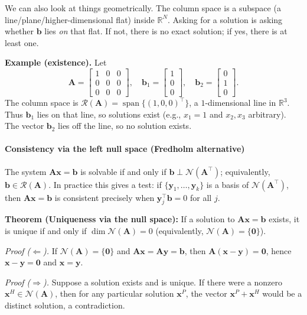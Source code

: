 We can also look at things geometrically. The column space is a subspace (a line/plane/higher-dimensional flat) inside $\mathbb{R}^N$. Asking for a solution is asking whether $\mathbf{b}$ lies \emph{on} that flat. If not, there is no exact solution; if yes, there is at least one.

\begin{exampleBox}
\textbf{Example (existence).} Let
\[
\mathbf{A}=\begin{bmatrix}1&0&0\\ 0&0&0\\ 0&0&0\end{bmatrix},\quad
\mathbf{b}_1=\begin{bmatrix}1\\0\\0\end{bmatrix},\quad
\mathbf{b}_2=\begin{bmatrix}0\\1\\0\end{bmatrix}.
\]
The column space is $\mathcal{R}(\mathbf{A})=\operatorname{span}\{(1,0,0)^{\top}\}$, a $1$-dimensional line in $\mathbb{R}^3$. Thus $\mathbf{b}_1$ lies on that line, so solutions exist (e.g., $x_1=1$ and $x_2,x_3$ arbitrary). The vector $\mathbf{b}_2$ lies off the line, so no solution exists.
\end{exampleBox}

\paragraph{Consistency via the left null space (Fredholm alternative)}
The system $\mathbf{A}\mathbf{x}=\mathbf{b}$ is solvable if and only if $\mathbf{b}\perp \mathcal{N}(\mathbf{A}^{\top})$; equivalently, $\mathbf{b}\in\mathcal{R}(\mathbf{A})$. In practice this gives a test: if $\{\mathbf{y}_1,\dots,\mathbf{y}_k\}$ is a basis of $\mathcal{N}(\mathbf{A}^{\top})$, then $\mathbf{A}\mathbf{x}=\mathbf{b}$ is consistent precisely when $\mathbf{y}_j^{\top}\mathbf{b}=0$ for all $j$.

\begin{theoremBox}
\textbf{Theorem (Uniqueness via the null space):} If a solution to $\mathbf{A}\mathbf{x}=\mathbf{b}$ exists, it is unique if and only if $\dim\mathcal{N}(\mathbf{A})=0$ (equivalently, $\mathcal{N}(\mathbf{A})=\{\mathbf{0}\}$).

\textit{Proof ($\Leftarrow$).}\; If $\mathcal{N}(\mathbf{A})=\{\mathbf{0}\}$ and $\mathbf{A}\mathbf{x}=\mathbf{A}\mathbf{y}=\mathbf{b}$, then $\mathbf{A}(\mathbf{x}-\mathbf{y})=\mathbf{0}$, hence $\mathbf{x}-\mathbf{y}=\mathbf{0}$ and $\mathbf{x}=\mathbf{y}$.

\textit{Proof ($\Rightarrow$).}\; Suppose a solution exists and is unique. If there were a nonzero $\mathbf{x}^{H}\in\mathcal{N}(\mathbf{A})$, then for any particular solution $\mathbf{x}^{P}$, the vector $\mathbf{x}^{P}+\mathbf{x}^{H}$ would be a distinct solution, a contradiction.
\end{theoremBox}


